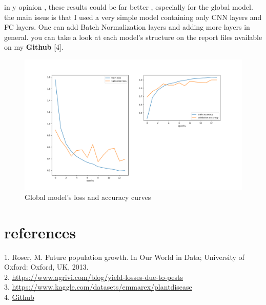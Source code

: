 \documentclass{article}
\begin{document}
\begin{multicols}{2}
in y opinion , these results could be far better , especially for the global model. the main issus is that I used a very simple model containing only CNN layers and FC layers. One can add Batch Normalization layers and adding more layers in general. you can take a look at each model's structure on the report files available on my \textbf{Github} [4].
\end{multicols}

\begin{figure}[H]
\centerline{\includegraphics[scale=0.4]{img/global_results}}
\caption{Global model's loss and accuracy curves}
\end{figure}

\section{references}
1.  Roser, M. Future population growth. In Our World in Data; University of Oxford: Oxford, UK, 2013.\\
2. \href{https://www.agrivi.com/blog/yield-losses-due-to-pests}{https://www.agrivi.com/blog/yield-losses-due-to-pests} \\
3. \href{https://www.kaggle.com/datasets/emmarex/plantdisease}{https://www.kaggle.com/datasets/emmarex/plantdisease}\\
4.  \href{}{Github}
\end{document}
